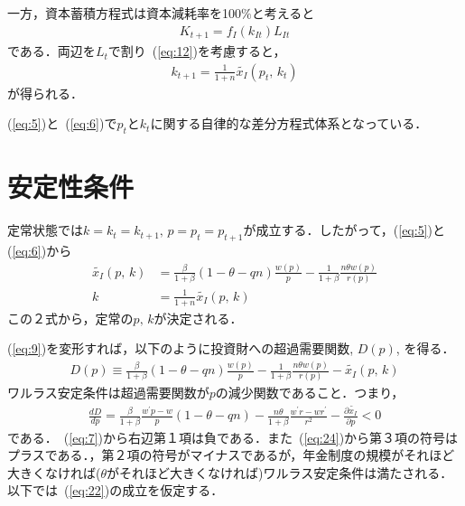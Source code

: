 \documentclass[12pt,a4paper]{jsarticle}
\begin{document}
一方，資本蓄積方程式は資本減耗率を100$\%$と考えると
\begin{align}
 K_{t+1} =  f_{I}(k_{It}) L_{It}
\end{align} 
である．両辺を$L_{t}$で割り~(\ref{eq:12})を考慮すると，
\begin{align}
 k_{t+1} = \frac{1}{1+n}\tilde{x_{I}}(p_{t}, \, k_{t}) \label{eq:6}
\end{align}
が得られる．

(\ref{eq:5})と~(\ref{eq:6})で$p_{t}$と$k_{t}$に関する自律的な差分方程式体系となっている．
\section{安定性条件}



定常状態では$k=k_{t} = k_{t+1}, \, p=p_{t} = p_{t+1}$が成立する．したがって，(\ref{eq:5})と(\ref{eq:6})から
\begin{align}
\tilde{x_{I}}(p, \, k)  &= \frac{\beta}{1+\beta}(1-\theta-qn)\frac{w(p)}{p} - \frac{1}{1+\beta}\frac{ n \theta w(p)}{r(p)} \label{eq:9} \\
 k &= \frac{1}{1+n}\tilde{x_{I}}(p, \, k) \label{eq:10}
\end{align}
この２式から，定常の$p, \, k$が決定される．

(\ref{eq:9})を変形すれば，以下のように投資財への超過需要関数, $D(p)$, を得る．
\begin{align}
 D(p)  \equiv \frac{\beta}{1+\beta}(1-\theta-qn)\frac{w(p)}{p} - \frac{1}{1+\beta}\frac{ n \theta w(p)}{r(p)} - \tilde{x_{I}}(p, \, k) \label{eq:16}
\end{align}
ワルラス安定条件は超過需要関数が$p$の減少関数であること．つまり，
\begin{align}
 \frac{dD}{dp} = \frac{\beta}{1+\beta}\frac{w^{\prime}p - w}{p}\left(1-\theta - qn \right) - \frac{n \theta}{1+\beta}\frac{w^{\prime}r - wr^{\prime}}{r^{2}} - \frac{\partial \tilde{x_{I}}}{\partial p} <0 \label{eq:22}
\end{align}
である．~(\ref{eq:7})から右辺第１項は負である．また~(\ref{eq:24})から第３項の符号はプラスである．，第２項の符号がマイナスであるが，年金制度の規模がそれほど大きくなければ($\theta$がそれほど大きくなければ)ワルラス安定条件は満たされる．以下では~(\ref{eq:22})の成立を仮定する．
\end{document}

